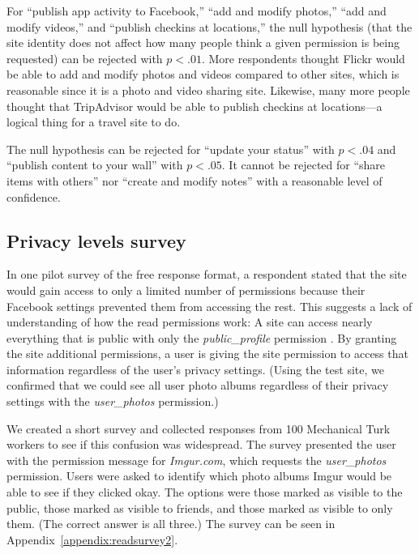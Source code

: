 \documentclass[10pt]{sig-alternate-10pt}
\begin{document}
For ``publish app activity to Facebook,'' ``add and modify photos,'' ``add and modify videos,'' and ``publish checkins at locations,'' the null hypothesis (that the site identity does not affect how many people think a given permission is being requested) can be rejected with $p < .01$. More respondents thought Flickr would be able to add and modify photos and videos compared to other sites, which is reasonable since it is a photo and video sharing site. Likewise, many more people thought that TripAdvisor would be able to publish checkins at locations---a logical thing for a travel site to do.

The null hypothesis can be rejected for ``update your status'' with $p < .04$ and ``publish content to your wall'' with $p < .05$. It cannot be rejected for ``share items with others'' nor ``create and modify notes'' with a reasonable level of confidence.



\subsection{Privacy levels survey}
\label{sec:privacysurvey}

In one pilot survey of the free response format, a respondent stated that the site would gain access to only a limited number of permissions because their Facebook settings prevented them from accessing the rest. This suggests a lack of understanding of how the read permissions work: A site can access nearly everything that is public with only the \emph{public\_profile} permission \cite{fbprivacyfaq}. By granting the site additional permissions, a user is giving the site permission to access that information regardless of the user's privacy settings. (Using the test site, we confirmed that we could see all user photo albums regardless of their privacy settings with the \emph{user\_photos} permission.)

We created a short survey and collected responses from 100 Mechanical Turk workers to see if this confusion was widespread. The survey presented the user with the permission message for \emph{Imgur.com}, which requests the \emph{user\_photos} permission. Users were asked to identify which photo albums Imgur would be able to see if they clicked okay. The options were those marked as visible to the public, those marked as visible to friends, and those marked as visible to only them. (The correct answer is all three.) The survey can be seen in Appendix~\ref{appendix:readsurvey2}.
\end{document}
